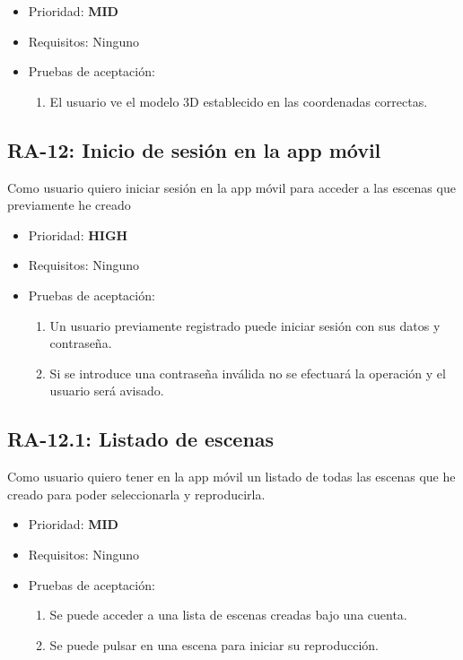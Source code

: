 \begin{itemize}
    \item Prioridad: \textbf{MID}
    \item Requisitos: Ninguno
    \item Pruebas de aceptación:
    \begin{enumerate}
		\item El usuario ve el modelo 3D establecido en las coordenadas correctas.
	\end{enumerate}
\end{itemize}

\subsection{RA-12: Inicio de sesión en la app móvil}
Como usuario quiero iniciar sesión en la app móvil para acceder a las escenas que previamente he creado

\begin{itemize}
    \item Prioridad: \textbf{HIGH}
    \item Requisitos: Ninguno
    \item Pruebas de aceptación:
    \begin{enumerate}
		\item Un usuario previamente registrado puede iniciar sesión con sus datos y contraseña.
		\item Si se introduce una contraseña inválida no se efectuará la operación y el usuario será avisado.
	\end{enumerate}
\end{itemize}

\subsection{RA-12.1: Listado de escenas}
Como usuario quiero tener en la app móvil un listado de todas las escenas que he creado para poder seleccionarla y reproducirla.

\begin{itemize}
    \item Prioridad: \textbf{MID}
    \item Requisitos: Ninguno
    \item Pruebas de aceptación:
    \begin{enumerate}
		\item Se puede acceder a una lista de escenas creadas bajo una cuenta.
		\item Se puede pulsar en una escena para iniciar su reproducción. 
	\end{enumerate}
\end{itemize}

